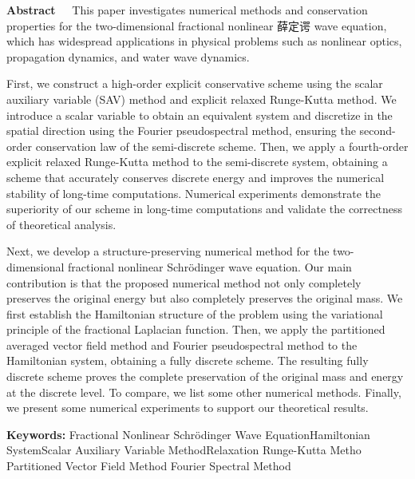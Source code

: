 \begin{EnglishAbstract}
\item {\bf Abstract\ \ } This paper investigates numerical methods and conservation properties for the two-dimensional fractional nonlinear 薛定谔 wave equation, which has widespread applications in physical problems such as nonlinear optics, propagation dynamics, and water wave dynamics.

First, we construct a high-order explicit conservative scheme using the scalar auxiliary variable (SAV) method and explicit relaxed Runge-Kutta method. We introduce a scalar variable to obtain an equivalent system and discretize in the spatial direction using the Fourier pseudospectral method, ensuring the second-order conservation law of the semi-discrete scheme. Then, we apply a fourth-order explicit relaxed Runge-Kutta method to the semi-discrete system, obtaining a scheme that accurately conserves discrete energy and improves the numerical stability of long-time computations.
Numerical experiments demonstrate the superiority of our scheme in long-time computations and validate the correctness of theoretical analysis.

Next, we develop a structure-preserving numerical method for the two-dimensional fractional nonlinear Schr{\"o}dinger wave equation. Our main contribution is that the proposed numerical method not only completely preserves the original energy but also completely preserves the original mass.
We first establish the Hamiltonian structure of the problem using the variational principle of the fractional Laplacian function. Then, we apply the partitioned averaged vector field method and Fourier pseudospectral method to the Hamiltonian system, obtaining a fully discrete scheme. The resulting fully discrete scheme proves the complete preservation of the original mass and energy at the discrete level.
To compare, we list some other numerical methods. Finally, we present some numerical experiments to support our theoretical results.
\item {\bf Keywords:} Fractional Nonlinear Schr{\"o}dinger Wave Equation\qquad Hamiltonian System\qquad Scalar Auxiliary Variable Method\qquad Relaxation Runge-Kutta Metho \qquad Partitioned Vector Field Method \qquad Fourier Spectral Method
\end{EnglishAbstract}